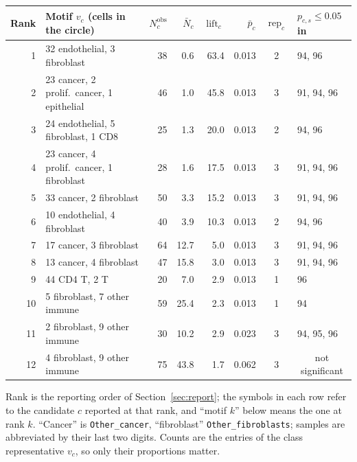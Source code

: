 \documentclass[11pt,a4paper]{article}
\theoremstyle{remark}
\newcommand{\obs}{\mathrm{obs}}
\newcommand{\lift}{\operatorname{lift}}
\newcommand{\rep}{\operatorname{rep}}
\begin{document}
\begin{center}
\footnotesize
\setlength{\tabcolsep}{4pt}
\begin{tabular}{rlrrrrcl}
\toprule
Rank & Motif $v_c$ (cells in the circle) & $N^{\obs}_c$ & $\bar N_c$ & $\lift_c$ & $\bar p_c$ & $\rep_c$ & $p_{c,s}\le0.05$ in \\
\midrule
1 & 32 endothelial, 3 fibroblast & 38 & 0.6 & 63.4 & 0.013 & 2 & 94, 96 \\
2 & 23 cancer, 2 prolif.\ cancer, 1 epithelial & 46 & 1.0 & 45.8 & 0.013 & 3 & 91, 94, 96 \\
3 & 24 endothelial, 5 fibroblast, 1 CD8 & 25 & 1.3 & 20.0 & 0.013 & 2 & 94, 96 \\
4 & 23 cancer, 4 prolif.\ cancer, 1 fibroblast & 28 & 1.6 & 17.5 & 0.013 & 3 & 91, 94, 96 \\
5 & 33 cancer, 2 fibroblast & 50 & 3.3 & 15.2 & 0.013 & 3 & 91, 94, 96 \\
6 & 10 endothelial, 4 fibroblast & 40 & 3.9 & 10.3 & 0.013 & 2 & 94, 96 \\
7 & 17 cancer, 3 fibroblast & 64 & 12.7 & 5.0 & 0.013 & 3 & 91, 94, 96 \\
8 & 13 cancer, 4 fibroblast & 47 & 15.8 & 3.0 & 0.013 & 3 & 91, 94, 96 \\
9 & 44 CD4 T, 2 T & 20 & 7.0 & 2.9 & 0.013 & 1 & 96 \\
10 & 5 fibroblast, 7 other immune & 59 & 25.4 & 2.3 & 0.013 & 1 & 94 \\
11 & 2 fibroblast, 9 other immune & 30 & 10.2 & 2.9 & 0.023 & 3 & 94, 95, 96 \\
\midrule
12 & 4 fibroblast, 9 other immune & 75 & 43.8 & 1.7 & 0.062 & 3 & \multicolumn{1}{c}{not significant} \\
\bottomrule
\end{tabular}
\end{center}
{\footnotesize Rank is the reporting order of Section~\ref{sec:report}; the
symbols in each row refer to the candidate $c$ reported at that rank, and
``motif $k$'' below means the one at rank $k$. ``Cancer'' is
\texttt{Other\_cancer}, ``fibroblast'' \texttt{Other\_fibroblasts}; samples
are abbreviated by their last two digits. Counts are the entries of the class
representative $v_c$, so only their proportions matter.}
\end{document}
